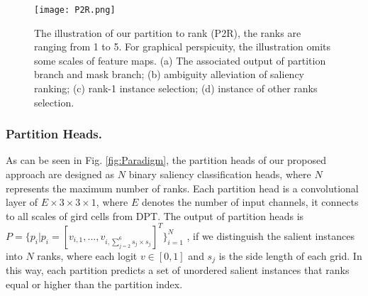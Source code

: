 \documentclass[sigconf]{acmart}
\begin{document}
\begin{figure}
	\begin{center}
		\texttt{[image: P2R.png]}
		\caption{The illustration of our partition to rank (P2R), the ranks are ranging from 1 to 5. For graphical perspicuity, the illustration omits some scales of feature maps. (a) The associated output of partition branch and mask branch; (b)  ambiguity alleviation of saliency ranking; (c) rank-1 instance selection; (d) instance of other ranks selection.
		}\label{fig:P2R}
	\end{center}
\end{figure}

\subsubsection{Partition Heads.} 
As can be seen in Fig. \ref{fig:Paradigm}, the partition heads of our proposed approach are designed as $N$ binary saliency classification heads, where $N$ represents the maximum number of ranks. 
Each partition head is a convolutional layer of $E\times 3 \times 3 \times 1$, where $E$ denotes the number of input channels, it connects to all scales of gird cells from DPT. The output of partition heads is $P=\{p_i|p_i=[v_{i,1},...,v_{i,{\sum_{j=2}^{6}}s_j\times s_j}]^T\}_{i=1}^N$ , if we distinguish the salient instances into $N$ ranks, where each logit $v\in[0,1]$ and $s_j$ is the side length of each grid.
In this way, each partition predicts a set of unordered salient instances that ranks equal or higher than the partition index.
\end{document}
